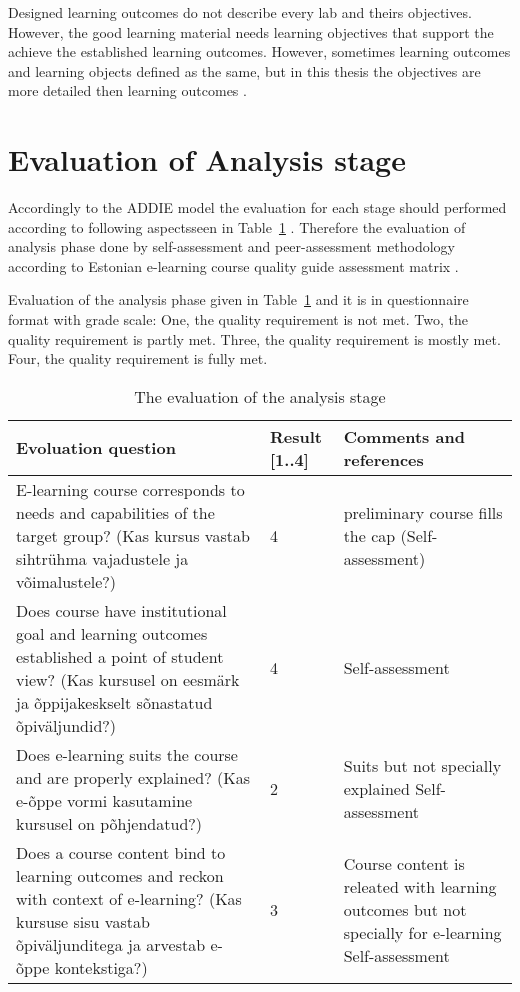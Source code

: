 Designed learning outcomes do not describe every lab and theirs objectives. However, the good learning material needs learning objectives that support the achieve the established learning outcomes. However, sometimes learning outcomes and learning objects defined as the same, but in this thesis the objectives are more detailed then learning outcomes \citep{website:objective_vs_outcome}.

\section{Evaluation of Analysis stage}

Accordingly to the \gls{ADDIE} model the evaluation for each stage should performed according to following aspectsseen in Table~\ref{tab:evoluation_analysis} \citep[p.~11]{OppeArenduskeskus2010}. Therefore the evaluation of analysis phase done by self-assessment and peer-assessment methodology according to Estonian e-learning course quality guide assessment matrix \citep{website:quality_mx}.

Evaluation of the analysis phase given in Table~\ref{tab:evoluation_analysis} and it is in questionnaire format with grade scale: One, the quality requirement is not met. Two, the quality requirement is partly met. Three, the quality requirement is mostly met. Four, the quality requirement is fully met.

\begin{table}[h]
\centering
\caption{The evaluation of the analysis stage }
{ \small 
\begin{tabular}{|p{6cm}|p{2cm}|p{5cm}|}
\hline 
\color{blue} Evoluation question & \color{blue} Result [1..4] & \color{blue} Comments and references \\ 
\hline
E-learning course corresponds to needs and capabilities of the target group? 
(Kas kursus vastab sihtrühma vajadustele ja võimalustele?) & 4  &  preliminary course fills the cap (Self-assessment)\\ 
\hline 
Does course have institutional goal and learning outcomes established a point of student view?
(Kas kursusel on eesmärk ja õppijakeskselt sõnastatud õpiväljundid?) & 4 & Self-assessment  \\ 
\hline 
Does e-learning suits the course and are properly explained?
(Kas e-õppe vormi kasutamine kursusel on põhjendatud?) & 2 & Suits but not specially explained Self-assessment \\ 
\hline
Does a course content bind to learning outcomes and reckon with context of e-learning?
(Kas kursuse sisu vastab õpiväljunditega ja arvestab e-õppe kontekstiga?) & 3 & Course content is releated with learning outcomes but not specially for e-learning Self-assessment \\ 
\hline 
\end{tabular} 
}
\label{tab:evoluation_analysis}
\end{table}

